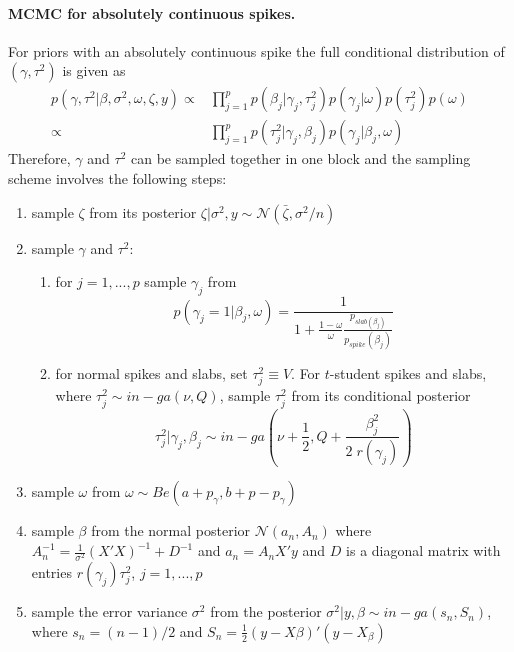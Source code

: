 \documentclass[11 pt]{article}
\begin{document}
\begin{multicols}{2}
\paragraph{MCMC for absolutely continuous spikes.} For priors with an absolutely continuous spike the full conditional distribution of $(\gamma, \tau^2)$ is given as
\begin{align*}
    p(\gamma,\tau^2|\beta,\sigma^2,\omega,\zeta,y) \propto & \prod_{j=1}^p p(\beta_j|\gamma_j,\tau^2_j)p(\gamma_j|\omega)p(\tau^2_j)p(\omega) \\
    \propto & \prod_{j=1}^p p(\tau^2_j|\gamma_j,\beta_j)p(\gamma_j|\beta_j,\omega)
\end{align*}
Therefore, $\gamma$ and $\tau^2$ can be sampled together in one block and the sampling scheme involves the following steps:
\begin{enumerate}
    \item sample $\zeta$ from its posterior $\zeta|\sigma^2,y \sim \mathcal{N}(\bar{\zeta}, \sigma^2/n)$
    \item sample $\gamma$ and $\tau^2$:
        \begin{enumerate}
            \item for $j = 1, ..., p$ sample $\gamma_j$ from $$p(\gamma_j=1|\beta_j,\omega)= \frac{1}{1+\frac{1-\omega}{\omega}\frac{p_{slab(\beta_j)}}{p_{spike}(\beta_j)}} $$
            \item for normal spikes and slabs, set $\tau^2_j \equiv V$. For $t$-student spikes and slabs, where $\tau^2_j \sim in-ga(\nu,Q)$, sample $\tau^2_j$ from its conditional posterior $$\tau^2_j|\gamma_j, \beta_j \sim in-ga\left(\nu+\frac{1}{2}, Q + \frac{\beta_j^2}{2\;r(\gamma_j)} \right)$$
        \end{enumerate}
    \item sample $\omega$ from $\omega \sim Be(a + p_\gamma, b + p - p_\gamma)$
    \item sample $\beta$ from the normal posterior $\mathcal{N}(a_n,A_n)$ where $A_n^{-1} = \frac{1}{\sigma^2}(X'X)^{-1}+D^{-1}$ and $a_n = A_n X'y$ and $D$ is a diagonal matrix with entries $r(\gamma_j)\tau^2_j$, $j = 1, ..., p$
    \item sample the error variance $\sigma^2$ from the posterior $\sigma^2|y, \beta \sim in-ga(s_n, S_n)$, where
    $s_n = (n - 1)/2$ and $S_n = \frac{1}{2}(y -X\beta)'(y -X_\beta)$
\end{enumerate}


\end{multicols}
\end{document}
